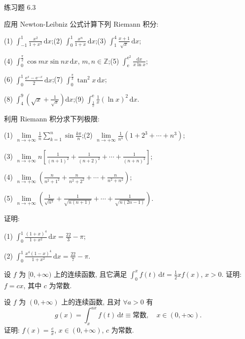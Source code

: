 \begin{exblock}{练习题 6.3}

  \item 应用 Newton-Leibniz 公式计算下列 Riemann 积分:

  (1) $\int_{-1}^{1}\frac{x^{2}}{1+x^{2}}\,\mathrm{d}x$;\qquad (2) $\int_{0}^{1}\frac{x^{n}}{1+x}\,\mathrm{d}x$;\qquad (3) $\int_{1}^{4}\frac{x+1}{\sqrt{x}}\,\mathrm{d}x$;

  (4) $\int_{0}^{\frac{\pi}{2}}\cos mx\sin nx\,\mathrm{d}x$, $m,n\in\mathbb{Z}$;\qquad (5) $\int_{\mathrm{e}}^{\mathrm{e}^{2}}\frac{\mathrm{d}x}{x\ln x}$;

  (6) $\int_{0}^{1}\frac{\mathrm{e}^{x}-\mathrm{e}^{-x}}{2}\,\mathrm{d}x$;\qquad (7) $\int_{0}^{\frac{\pi}{3}}\tan^{2}x\,\mathrm{d}x$;

  (8) $\int_{4}^{9}\left(\sqrt{x}+\frac{1}{\sqrt{x}}\right)\mathrm{d}x$;\qquad (9) $\int_{\frac{1}{\mathrm{e}}}^{\mathrm{e}}\frac{1}{x}(\ln x)^{2}\,\mathrm{d}x$.

  \item 利用 Riemann 积分求下列极限:

  (1) $\lim\limits_{n\to+\infty}\frac{1}{n}\sum\limits_{k=1}^{n}\sin\frac{k\pi}{n}$;\qquad (2) $\lim\limits_{n\to+\infty}\frac{1}{n^{4}}(1+2^{3}+\cdots+n^{3})$;

  (3) $\lim\limits_{n\to+\infty}n\left[\frac{1}{(n+1)^{2}}+\frac{1}{(n+2)^{2}}+\cdots+\frac{1}{(n+n)^{2}}\right]$;

  (4) $\lim\limits_{n\to+\infty}\left(\frac{n}{n^{2}+1^{2}}+\frac{n}{n^{2}+2^{2}}+\cdots+\frac{n}{n^{2}+n^{2}}\right)$;

  (5) $\lim\limits_{n\to+\infty}\left(\frac{1}{\sqrt{n^{2}}}+\frac{1}{\sqrt{n(n+1)}}+\cdots+\frac{1}{\sqrt{n(2n-1)}}\right)$.

  \item 证明:

  (1) $\int_{0}^{1}\frac{(1+x)^{4}}{1+x^{2}}\,\mathrm{d}x=\frac{22}{3}-\pi$;

  (2) $\int_{0}^{1}\frac{x^{4}(1-x)^{4}}{1+x^{2}}\,\mathrm{d}x=\frac{22}{7}-\pi$.

  \item 设 $f$ 为 $[0,+\infty)$ 上的连续函数, 且它满足 $\int_{0}^{x}f(t)\,\mathrm{d}t=\frac{1}{2}xf(x)$, $x>0$. 证明: $f=cx$, 其中 $c$ 为常数.

  \item 设 $f$ 为 $(0,+\infty)$ 上的连续函数, 且对 $\forall a>0$ 有
  \[
  g(x)=\int_{x}^{ax}f(t)\,\mathrm{d}t\equiv\text{常数},\quad x\in(0,+\infty).
\]
  证明: $f(x)=\frac{c}{x}$, $x\in(0,+\infty)$, $c$ 为常数.


\end{exblock}

